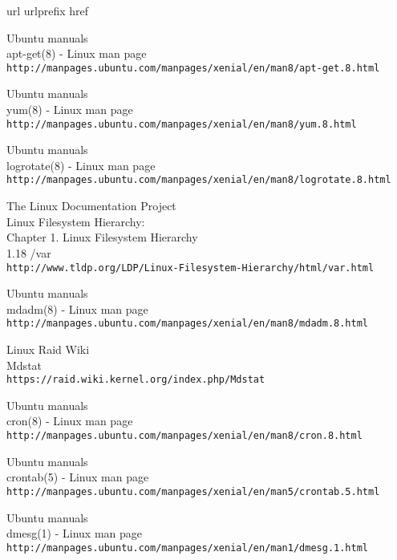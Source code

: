 \begin{thebibliography}{10}
\expandafter\ifx\csname url\endcsname\relax
  \def\url#1{\texttt{#1}}\fi
\expandafter\ifx\csname urlprefix\endcsname\relax\def\urlprefix{URL }\fi
\expandafter\ifx\csname href\endcsname\relax
  \def\href#1#2{#2} \def\path#1{#1}\fi

Ubuntu manuals\\
apt-get(8) - Linux man page\\
  \url{http://manpages.ubuntu.com/manpages/xenial/en/man8/apt-get.8.html}

Ubuntu manuals\\
yum(8) - Linux man page\\
  \url{http://manpages.ubuntu.com/manpages/xenial/en/man8/yum.8.html}

Ubuntu manuals\\
logrotate(8) - Linux man page\\
  \url{http://manpages.ubuntu.com/manpages/xenial/en/man8/logrotate.8.html}

The Linux Documentation Project\\
Linux Filesystem Hierarchy:\\
Chapter 1. Linux Filesystem Hierarchy\\
1.18 \slash var \\
  \url{http://www.tldp.org/LDP/Linux-Filesystem-Hierarchy/html/var.html}

Ubuntu manuals\\
mdadm(8) - Linux man page\\
  \url{http://manpages.ubuntu.com/manpages/xenial/en/man8/mdadm.8.html}

Linux Raid Wiki\\
Mdstat\\
  \url{https://raid.wiki.kernel.org/index.php/Mdstat}

Ubuntu manuals\\
cron(8) - Linux man page\\
  \url{http://manpages.ubuntu.com/manpages/xenial/en/man8/cron.8.html}

Ubuntu manuals\\
crontab(5) - Linux man page\\
  \url{http://manpages.ubuntu.com/manpages/xenial/en/man5/crontab.5.html}

Ubuntu manuals\\
dmesg(1) - Linux man page\\
  \url{http://manpages.ubuntu.com/manpages/xenial/en/man1/dmesg.1.html}


\end{thebibliography}
